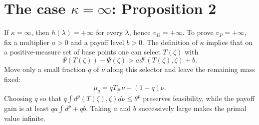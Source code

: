 \section{The case \(\kappa=\infty\): Proposition 2}
If \(\kappa=\infty\), then \(h(\lambda)=+\infty\) for every \(\lambda\), hence \(v_D=+\infty\).
To prove \(v_P=+\infty\), fix a multiplier \(a>0\) and a payoff level \(b>0\).  The definition of
\(\kappa\) implies that on a positive-measure set of base points one can select \(T(\zeta)\) with
\[
 \Psi(T(\zeta))-\Psi(\zeta)>a d^p(T(\zeta),\zeta)+b.
\]
Move only a small fraction \(q\) of \(\nu\) along this selector and leave the remaining mass fixed:
\[
 \mu_q=qT_\#\nu+(1-q)\nu.
\]
Choosing \(q\) so that \(q\int d^p(T(\zeta),\zeta)d\nu\le\theta^p\) preserves feasibility, while the
payoff gain is at least \(qa\int d^p+qb\).  Taking \(a\) and \(b\) successively large makes the
primal value infinite.


